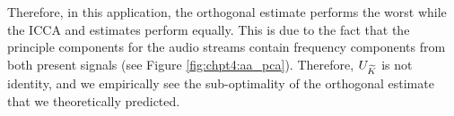 Therefore, in this application, the orthogonal estimate performs the worst while the
ICCA and \iccap estimates perform equally. This is due to the fact that the principle
components for the audio streams contain frequency components from both present signals
(see Figure \ref{fig:chpt4:aa_pca}). Therefore, $U_{\widetilde{K}}$ is not identity, and we
empirically see the sub-optimality of the orthogonal estimate that we theoretically predicted.

\begin{figure}
  \begin{center}
\end{center}
\end{figure}
